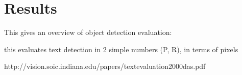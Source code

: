 \section{Results}\label{sec:detection_results}
	This gives an overview of object detection evaluation:


	this evaluates text detection in 2 simple numbers (P, R), in terms of pixels

	http://vision.soic.indiana.edu/papers/textevaluation2000das.pdf



